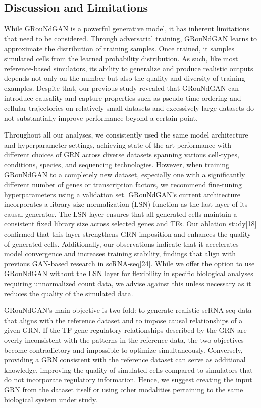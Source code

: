 \subsection*{Discussion and Limitations}

While GRouNdGAN is a powerful generative model, it has inherent limitations that need to be
considered. Through adversarial training, GRouNdGAN learns to approximate the distribution of
training samples. Once trained, it samples simulated cells from the learned probability
distribution. As such, like most reference-based simulators, its ability to generalize and produce
realistic outputs depends not only on the number but also the quality and diversity of training
examples. Despite that, our previous study revealed that GRouNdGAN can introduce causality
and capture properties such as pseudo-time ordering and cellular trajectories on relatively small
datasets and excessively large datasets do not substantially improve performance beyond a
certain point. 

Throughout all our analyses, we consistently used the same model architecture and
hyperparameter settings, achieving state-of-the-art performance with different choices of GRN
across diverse datasets spanning various cell-types, conditions, species, and sequencing
technologies. However, when training GRouNdGAN to a completely new dataset, especially one
with a significantly different number of genes or transcription factors, we recommend fine-tuning hyperparameters using a validation set. GRouNdGAN’s current architecture incorporates a
library-size normalization (LSN) function as the last layer of its causal generator. The LSN layer
ensures that all generated cells maintain a consistent fixed library size across selected genes and
TFs. Our ablation study[18] confirmed that this layer strengthens GRN imposition and enhances
the quality of generated cells. Additionally, our observations indicate that it accelerates model
convergence and increases training stability, findings that align with previous GAN-based
research in scRNA-seq[24]. While we offer the option to use GRouNdGAN without the LSN layer
for flexibility in specific biological analyses requiring unnormalized count data, we advise against
this unless necessary as it reduces the quality of the simulated data. 

GRouNdGAN’s main objective is two-fold: to generate realistic scRNA-seq data that aligns with
the reference dataset and to impose causal relationships of a given GRN. If the TF-gene regulatory
relationships described by the GRN are overly inconsistent with the patterns in the reference
data, the two objectives become contradictory and impossible to optimize simultaneously.
Conversely, providing a GRN consistent with the reference dataset can serve as additional
knowledge, improving the quality of simulated cells compared to simulators that do not
incorporate regulatory information. Hence, we suggest creating the input GRN from the dataset
itself or using other modalities pertaining to the same biological system under study. 

